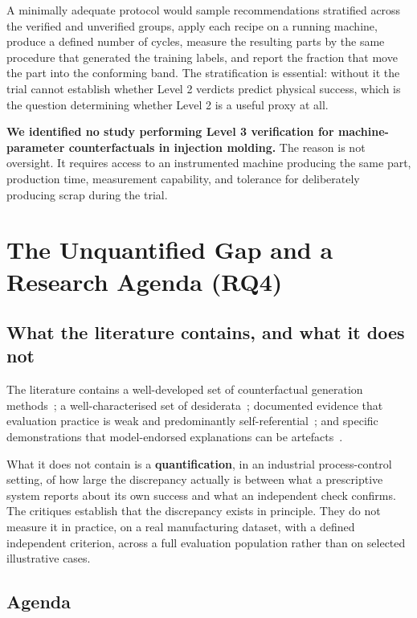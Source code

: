 \documentclass[11pt,a4paper]{article}
\begin{document}
A minimally adequate protocol would sample recommendations stratified across the verified and unverified groups, apply each recipe on a running machine, produce a defined number of cycles, measure the resulting parts by the same procedure that generated the training labels, and report the fraction that move the part into the conforming band. The stratification is essential: without it the trial cannot establish whether Level 2 verdicts predict physical success, which is the question determining whether Level 2 is a useful proxy at all.

\textbf{We identified no study performing Level 3 verification for machine-parameter counterfactuals in injection molding.} The reason is not oversight. It requires access to an instrumented machine producing the same part, production time, measurement capability, and tolerance for deliberately producing scrap during the trial.

\section{The Unquantified Gap and a Research Agenda (RQ4)}\label{sec:gap}

\subsection{What the literature contains, and what it does not}

The literature contains a well-developed set of counterfactual generation methods~\cite{wachter2018,mothilal2020,poyiadzi2020,vanlooveren2021}; a well-characterised set of desiderata~\cite{verma2024,guidotti2024}; documented evidence that evaluation practice is weak and predominantly self-referential~\cite{keane2021,nauta2023}; and specific demonstrations that model-endorsed explanations can be artefacts~\cite{laugel2019,slack2020,adebayo2018}.

What it does not contain is a \textbf{quantification}, in an industrial process-control setting, of how large the discrepancy actually is between what a prescriptive system reports about its own success and what an independent check confirms. The critiques establish that the discrepancy exists in principle. They do not measure it in practice, on a real manufacturing dataset, with a defined independent criterion, across a full evaluation population rather than on selected illustrative cases.

\subsection{Agenda}
\end{document}
